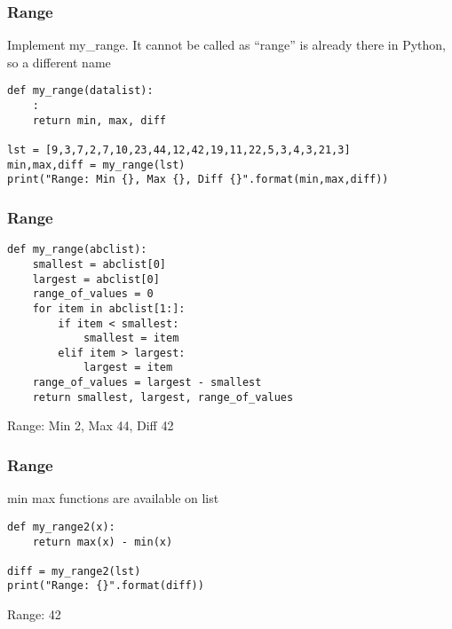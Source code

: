 \begin{frame}[fragile]\frametitle{Range}
Implement my\_range. It cannot be called as ``range'' is already there in Python, so a different name
\begin{lstlisting}
def my_range(datalist):
	:
	return min, max, diff

lst = [9,3,7,2,7,10,23,44,12,42,19,11,22,5,3,4,3,21,3]
min,max,diff = my_range(lst)
print("Range: Min {}, Max {}, Diff {}".format(min,max,diff))
\end{lstlisting}
\end{frame}

\begin{frame}[fragile]\frametitle{Range}
\begin{lstlisting}
def my_range(abclist):
    smallest = abclist[0]
    largest = abclist[0]
    range_of_values = 0
    for item in abclist[1:]:
        if item < smallest:
            smallest = item
        elif item > largest:
            largest = item
    range_of_values = largest - smallest
    return smallest, largest, range_of_values
\end{lstlisting}
Range: Min 2, Max 44, Diff 42
\end{frame}

\begin{frame}[fragile]\frametitle{Range}
min max functions are available on list
\begin{lstlisting}
def my_range2(x):
	return max(x) - min(x)

diff = my_range2(lst)
print("Range: {}".format(diff))	
\end{lstlisting}
Range: 42
\end{frame}




